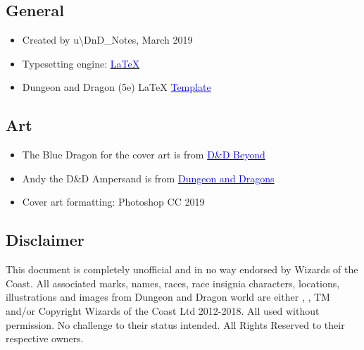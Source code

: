 \documentclass[letterpaper,10pt,twoside,twocolumn,openany]{book}
\begin{document}
\subsection{General}
\begin{itemize}
    \item Created by u\textbackslash DnD\_Notes, March 2019
    \item Typesetting engine: \href{https://www.latex-project.org/}{\textcolor{blue}{\LaTeX}}
    \item Dungeon and Dragon (5e) LaTeX \href{https://github.com/rpgtex/DND-5e-LaTeX-Template}{\textcolor{blue}{Template}}
\end{itemize}

\subsection{Art}
\begin{itemize}
    \item The Blue Dragon for the cover art is from \href{https://www.dndbeyond.com/}{\textcolor{blue}{D\&D Beyond}}
    \item Andy the D\&D Ampersand is from \href{https://www.dnd.wizards.com}{\textcolor{blue}{Dungeon and Dragons}} 
    \item Cover art formatting: Photoshop CC 2019
\end{itemize}
\subsection{Disclaimer}
This document is completely unofficial and in no way endorsed by Wizards of the Coast. All associated marks, names, races, race insignia characters, locations, illustrations and images from Dungeon and Dragon world are either \textregistered, \textcopyright, TM and/or Copyright Wizards of the Coast Ltd 2012-2018. All used without permission. No challenge to their status intended. All Rights Reserved to their respective owners.
\end{document}
